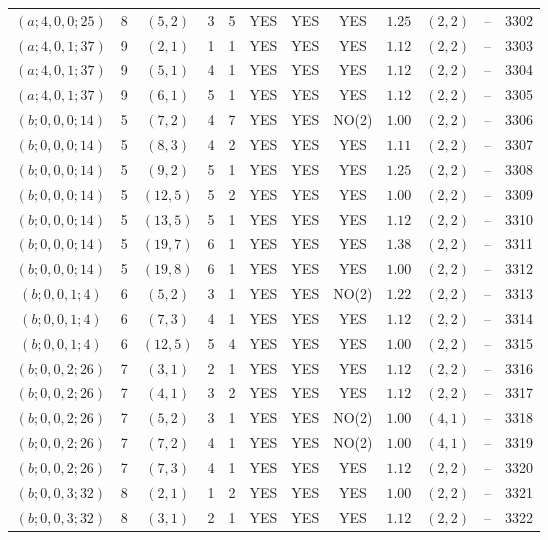 \begin{longtable}{|c|c|c|c|c|c|c|c|c|c|c|c|}
$(a;4,0,0;25)$ & 8 & $(5,2)$ & 3 & 5 & YES & YES & YES & $1.25$ & $(2,2)$ & -- & 3302\\
$(a;4,0,1;37)$ & 9 & $(2,1)$ & 1 & 1 & YES & YES & YES & $1.12$ & $(2,2)$ & -- & 3303\\
$(a;4,0,1;37)$ & 9 & $(5,1)$ & 4 & 1 & YES & YES & YES & $1.12$ & $(2,2)$ & -- & 3304\\
$(a;4,0,1;37)$ & 9 & $(6,1)$ & 5 & 1 & YES & YES & YES & $1.12$ & $(2,2)$ & -- & 3305\\
$(b;0,0,0;14)$ & 5 & $(7,2)$ & 4 & 7 & YES & YES & NO(2) & $1.00$ & $(2,2)$ & -- & 3306\\
$(b;0,0,0;14)$ & 5 & $(8,3)$ & 4 & 2 & YES & YES & YES & $1.11$ & $(2,2)$ & -- & 3307\\
$(b;0,0,0;14)$ & 5 & $(9,2)$ & 5 & 1 & YES & YES & YES & $1.25$ & $(2,2)$ & -- & 3308\\
$(b;0,0,0;14)$ & 5 & $(12,5)$ & 5 & 2 & YES & YES & YES & $1.00$ & $(2,2)$ & -- & 3309\\
$(b;0,0,0;14)$ & 5 & $(13,5)$ & 5 & 1 & YES & YES & YES & $1.12$ & $(2,2)$ & -- & 3310\\
$(b;0,0,0;14)$ & 5 & $(19,7)$ & 6 & 1 & YES & YES & YES & $1.38$ & $(2,2)$ & -- & 3311\\
$(b;0,0,0;14)$ & 5 & $(19,8)$ & 6 & 1 & YES & YES & YES & $1.00$ & $(2,2)$ & -- & 3312\\
$(b;0,0,1;4)$ & 6 & $(5,2)$ & 3 & 1 & YES & YES & NO(2) & $1.22$ & $(2,2)$ & -- & 3313\\
$(b;0,0,1;4)$ & 6 & $(7,3)$ & 4 & 1 & YES & YES & YES & $1.12$ & $(2,2)$ & -- & 3314\\
$(b;0,0,1;4)$ & 6 & $(12,5)$ & 5 & 4 & YES & YES & YES & $1.00$ & $(2,2)$ & -- & 3315\\
$(b;0,0,2;26)$ & 7 & $(3,1)$ & 2 & 1 & YES & YES & YES & $1.12$ & $(2,2)$ & -- & 3316\\
$(b;0,0,2;26)$ & 7 & $(4,1)$ & 3 & 2 & YES & YES & YES & $1.12$ & $(2,2)$ & -- & 3317\\
$(b;0,0,2;26)$ & 7 & $(5,2)$ & 3 & 1 & YES & YES & NO(2) & $1.00$ & $(4,1)$ & -- & 3318\\
$(b;0,0,2;26)$ & 7 & $(7,2)$ & 4 & 1 & YES & YES & NO(2) & $1.00$ & $(4,1)$ & -- & 3319\\
$(b;0,0,2;26)$ & 7 & $(7,3)$ & 4 & 1 & YES & YES & YES & $1.12$ & $(2,2)$ & -- & 3320\\
$(b;0,0,3;32)$ & 8 & $(2,1)$ & 1 & 2 & YES & YES & YES & $1.00$ & $(2,2)$ & -- & 3321\\
$(b;0,0,3;32)$ & 8 & $(3,1)$ & 2 & 1 & YES & YES & YES & $1.12$ & $(2,2)$ & -- & 3322\\

\end{longtable}
